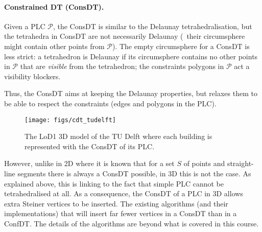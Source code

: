 



%
\paragraph*{Constrained DT (ConsDT).}

Given a PLC $\mathcal{P}$, the ConsDT is similar to the Delaunay tetrahedralisation, but the tetrahedra in ConsDT are not necessarily Delaunay (\ie\ their circumsphere might contain other points from $\mathcal{P}$). 
The empty circumsphere for a ConsDT is less strict: a tetrahedron is Delaunay if its circumsphere contains no other points in $\mathcal{P}$ that are \emph{visible} from the tetrahedron; the constraints polygons in $\mathcal{P}$ act a visibility blockers. 

%

Thus, the ConsDT aims at keeping the Delaunay properties, but relaxes them to be able to respect the constraints (edges and polygons in the PLC).
\begin{figure*}
  \centering
  \texttt{[image: figs/cdt\_tudelft]}
  \caption{The LoD1 3D model of the TU Delft where each building is represented with the ConsDT of its PLC.}%
\label{fig:cdt_tudelft}
\end{figure*}

%

However, unlike in 2D where it is known that for a set $S$ of points and straight-line segments there is always a ConsDT possible, in 3D this is not the case.
As explained above, this is linking to the fact that simple PLC cannot be tetrahedralised at all.
As a consequence, the ConsDT of a PLC in 3D allows extra Steiner vertices to be inserted.
The existing algorithms (and their implementations) that will insert far fewer vertices in a ConsDT than in a ConfDT\@. 
The details of the algorithms are beyond what is covered in this course.

